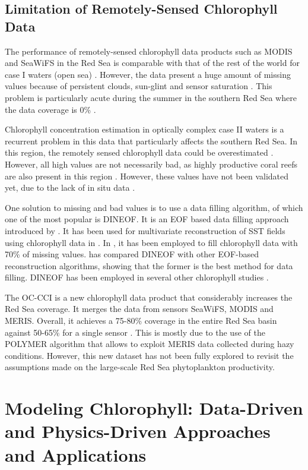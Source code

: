 \subsection{Limitation of Remotely-Sensed Chlorophyll Data}

The performance of remotely-sensed chlorophyll data products such as MODIS and SeaWiFS in the Red Sea is comparable with that of the rest of the world for case I waters (open sea) \cite{Brewin2013}. However, the data present a huge amount of missing values because of persistent clouds, sun-glint and sensor saturation \cite{Racault}. This problem is particularly acute during the summer in the southern Red Sea where the data coverage is 0\% \cite{Racault}.

Chlorophyll concentration estimation in optically complex case II waters is a recurrent problem in this data that particularly affects the southern Red Sea. In this region, the remotely sensed chlorophyll data could be overestimated \cite{Raitsos2013}. However, all high values are not necessarily bad, as highly productive coral reefs are also present in this region \cite{Raitsos2013}. However, these values have not been validated yet, due to the lack of in situ data \cite{Raitsos2013}.

One solution to missing and bad values is to use a data filling algorithm, of which one of the most popular is DINEOF. It is an EOF based data filling approach introduced by \cite{Beckers2003}. It has been used for multivariate reconstruction of SST fields using chlorophyll data in \cite{Alvera2007}. In \cite{Sicarjobs2011}, it has been employed to fill chlorophyll data with 70\% of missing values. \cite{Taylor2013} has compared DINEOF with other EOF-based reconstruction algorithms, showing that the former is the best method for data filling. DINEOF has been employed in several other chlorophyll studies \cite{Miles2010, Waite2013}.

The OC-CCI is a new chlorophyll data product that considerably increases the Red Sea coverage. It merges the data from sensors SeaWiFS, MODIS and MERIS. Overall, it achieves a 75-80\% coverage in the entire Red Sea basin against 50-65\% for a single sensor \cite{Racault}. This is mostly due to the use of the POLYMER algorithm \cite{Steinmetz2011} that allows to exploit MERIS data collected during hazy conditions. However, this new dataset has not been fully explored to revisit the assumptions made on the large-scale Red Sea phytoplankton productivity.

\section{Modeling Chlorophyll: Data-Driven and Physics-Driven Approaches and Applications}

